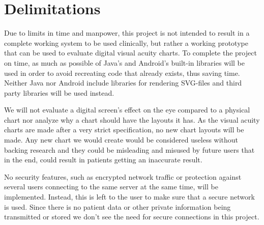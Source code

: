 \documentclass[12pt,a4paper,notitlepage]{report}
\begin{document}


\section{Delimitations}
Due to limits in time and manpower, this project is not intended to result in a complete working system to be used clinically, but rather a working prototype that can be used to evaluate digital visual acuity charts. To complete the project on time, as much as possible of Java's and Android's built-in libraries will be used in order to avoid recreating code that already exists, thus saving time. Neither Java nor Android include libraries for rendering SVG-files and third party libraries will be used instead.


We will not evaluate a digital screen's effect on the eye compared to a physical chart nor analyze why a chart should have the layouts it has. As the visual acuity charts are made after a very strict specification, no new chart layouts will be made. Any new chart we would create would be considered useless without backing research and they could be misleading and misused by future users that in the end, could result in patients getting an inaccurate result.

No security features, such as encrypted network traffic or protection against several users connecting to the same server at the same time, will be implemented. Instead, this is left to the user to make sure that a secure network is used. Since there is no patient data or other private information being transmitted or stored we don't see the need for secure connections in this project.
\end{document}
